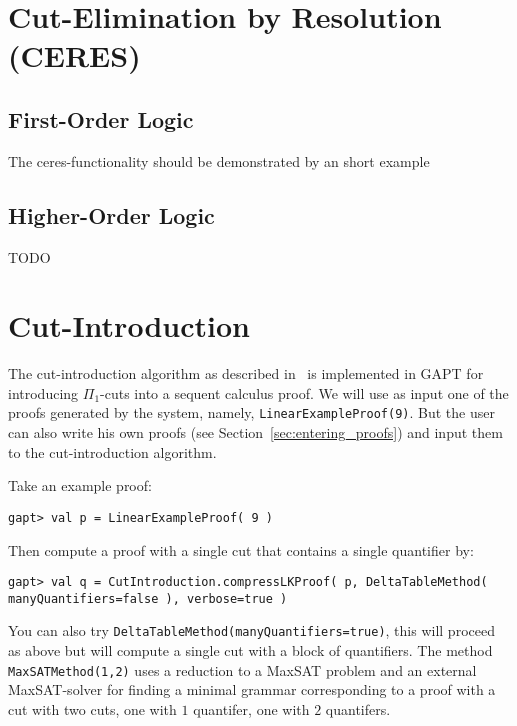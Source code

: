 \documentclass[a4paper,11pt]{article}
\newenvironment{meta}{\color{red}}{\color{black}} %
\begin{document}
\section{Cut-Elimination by Resolution (CERES)}


\subsection{First-Order Logic}

\begin{meta}
The ceres-functionality should be demonstrated by an short example
\end{meta}

\subsection{Higher-Order Logic}

\begin{meta}
TODO
\end{meta}


\section{Cut-Introduction}

The cut-introduction algorithm as described in~\cite{Hetzl2012,Hetzl14Algorithmic,Hetzl14Introducing} is
implemented in GAPT for introducing $\Pi_1$-cuts into a sequent calculus
proof. We will use as input one of the proofs generated by
the system, namely, \texttt{LinearExampleProof(9)}. But the user can also
write his own proofs (see Section~\ref{sec:entering_proofs})
and input them to the cut-introduction algorithm.

Take an example proof:
\begin{lstlisting}
gapt> val p = LinearExampleProof( 9 )
\end{lstlisting}
Then compute a proof with a single cut that contains a single quantifier by:
\begin{lstlisting}
gapt> val q = CutIntroduction.compressLKProof( p, DeltaTableMethod( manyQuantifiers=false ), verbose=true )
\end{lstlisting}
You can also try \texttt{DeltaTableMethod(manyQuantifiers=true)}, this will proceed as above but will
compute a single cut with a block of quantifiers.  The method \texttt{MaxSATMethod(1,2)}
uses a reduction to a MaxSAT problem and an external MaxSAT-solver for finding a
minimal grammar corresponding to a proof with a cut with two cuts, one with $1$
quantifer, one with $2$ quantifers.
\end{document}
